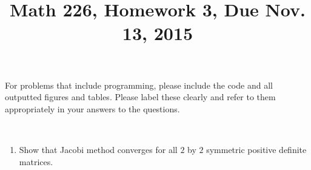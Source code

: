 \documentclass[12pt]{amsart}
\numberwithin{equation}{section}
\numberwithin{table}{section}
\numberwithin{figure}{section}
\numberwithin{algorithm}{section}
\begin{document}
\title[]{Math 226, Homework 3, Due Nov. 13, 2015}

\maketitle


For problems that include programming, please include the code and all outputted figures and tables.  Please label these clearly and refer to them appropriately in your answers to the questions.

\


\begin{enumerate}

\item Show that Jacobi method converges for all $2$ by $2$ symmetric positive definite matrices. 

\


\end{enumerate}
\end{document}
